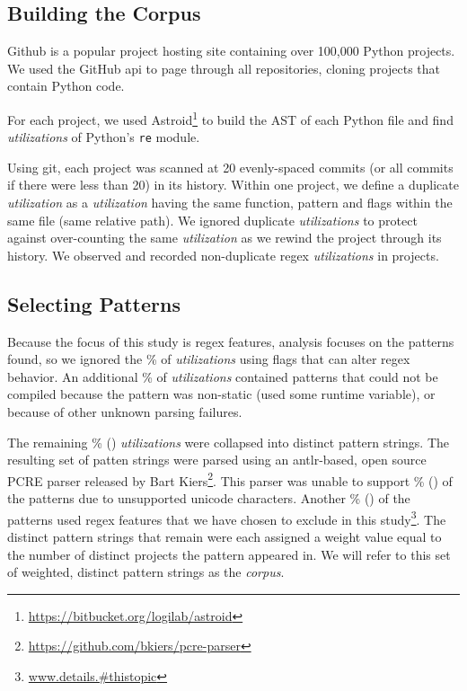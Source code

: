 \subsection{Building the Corpus}
\label{study:corpus}
Github is a popular project hosting site containing over 100,000 Python projects.
We used the GitHub api to page through all repositories, cloning projects that contain Python code.

For each project, we used Astroid\footnote{\url{https://bitbucket.org/logilab/astroid}} to build the AST of each Python file and find \emph{utilizations} of Python's {\tt re} module.

Using git, each project was scanned at 20 evenly-spaced commits (or all commits if there were less than 20) in its history.
Within one project, we define a duplicate \emph{utilization} as a \emph{utilization} having the same function, pattern and flags within the same file (same relative path).  We ignored duplicate \emph{utilizations} to protect against over-counting the same \emph{utilization} as we rewind the project through its history.  We observed and recorded  non-duplicate regex \emph{utilizations} in  projects.

\subsection{Selecting Patterns}
Because the focus of this study is regex features,  analysis focuses on the patterns found, so we ignored the \%  of \emph{utilizations} using flags that can alter regex behavior.  An additional \% of \emph{utilizations} contained patterns that could not be compiled because the pattern was non-static (used some runtime variable), or because of other unknown parsing failures.

The remaining \% () \emph{utilizations} were collapsed into  distinct pattern strings.  The resulting set of patten strings were parsed using an antlr-based, open source PCRE parser released by Bart Kiers\footnote{\url{https://github.com/bkiers/pcre-parser}}.  This parser was unable to support \% () of the patterns due to unsupported unicode characters.  Another \% () of the patterns used regex features that we have chosen to exclude in this study\footnote{\url{www.details.#thistopic}}.  The  distinct pattern strings that remain were each assigned a weight value equal to the number of distinct projects the pattern appeared in.  We will refer to this set of weighted, distinct pattern strings as the \emph{corpus}.

